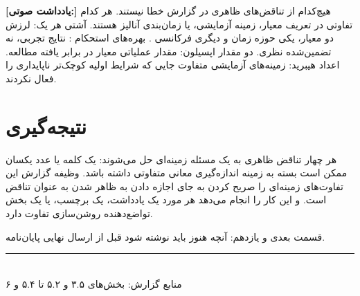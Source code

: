 \documentclass[12pt, a4paper]{article}
\newcommand{\dash}{\lr{---}}
\begin{document}
\begin{mdframed}[
  backgroundcolor=audiotan,
  linecolor=audionote!70,
  linewidth=1pt,
  innerleftmargin=12pt,
  innerrightmargin=12pt,
  innertopmargin=8pt,
  innerbottommargin=8pt
]
\textbf{\color{audionote}[يادداشت صوتی:]}
هيچ‌کدام از تناقض‌های ظاهری در گزارش خطا نيستند. هر کدام تفاوتی در تعريف معيار، زمينه آزمايشی، يا زمان‌بندی آناليز هستند. آشتی هر يک: لرزش دو معيار، يکی حوزه زمان  و ديگری فرکانسی . بهره‌های استحکام : نتايج تجربی، نه تضمين‌شده نظری. دو مقدار اپسيلون: مقدار عملياتی معيار در برابر يافته مطالعه. اعداد هيبريد: زمينه‌های آزمايشی متفاوت جايی که شرايط اوليه کوچک‌تر ناپايداری را فعال نکردند.
\end{mdframed}

\vspace{0.6cm}

\section{نتيجه‌گيری}

هر چهار تناقض ظاهری به يک مسئله زمينه‌ای حل می‌شوند: يک کلمه يا عدد يکسان ممکن است بسته به زمينه اندازه‌گيری معانی متفاوتی داشته باشد. وظيفه گزارش اين تفاوت‌های زمينه‌ای را صريح کردن به جای اجازه دادن به ظاهر شدن به عنوان تناقض است. و اين کار را انجام می‌دهد \dash{} هر مورد يک يادداشت، يک برچسب، يا يک بخش تواضع‌دهنده روشن‌سازی تفاوت دارد.

قسمت بعدی و يازدهم: آنچه هنوز بايد نوشته شود قبل از ارسال نهايی پايان‌نامه.

\vspace{1.5cm}
\begin{center}
{\color{seriesblue}\rule{0.45\linewidth}{0.4pt}}\\[8pt]
{\small\color{sectiongray}
منابع گزارش: بخش‌های ۳.۵ و ۵.۲ تا ۵.۴ و ۶
}
\end{center}
\end{document}

